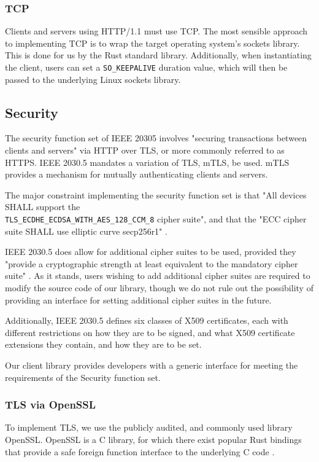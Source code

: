 \subsubsection{TCP}
Clients and servers using HTTP/1.1 must use TCP. The most sensible approach to implementing TCP is to wrap the target operating system's sockets library. This is done for us by the Rust standard library. Additionally, when instantiating the client, users can set a \texttt{SO\_KEEPALIVE} duration value, which will then be passed to the underlying Linux sockets library.

\subsection{Security}
The security function set of IEEE 20305 involves "securing transactions between clients and servers" via HTTP over TLS, or more commonly referred to as HTTPS. IEEE 2030.5 mandates a variation of TLS, mTLS, be used. mTLS provides a mechanism for mutually authenticating clients and servers. 

The major constraint implementing the security function set is that "All devices SHALL support the \\ \texttt{TLS\_ECDHE\_ECDSA\_WITH\_AES\_128\_CCM\_8} cipher suite", and that the "ECC cipher suite SHALL use elliptic curve secp256r1" \cite{IEEE2030.5}.

IEEE 2030.5 does allow for additional cipher suites to be used, provided they "provide a cryptographic strength at least equivalent to the mandatory cipher suite" \cite{IEEE2030.5}.  As it stands, users wishing to add additional cipher suites are required to modify the source code of our library, though we do not rule out the possibility of providing an interface for setting additional cipher suites in the future.

Additionally, IEEE 2030.5 defines six classes of X509 certificates, each with different restrictions on how they are to be signed, and what  X509 certificate extensions they contain, and how they are to be set.

Our client library provides developers with a generic interface for meeting the requirements of the Security function set.

\subsubsection{TLS via OpenSSL}
To implement TLS, we use the publicly audited, and commonly used library OpenSSL. OpenSSL is a C library, for which there exist popular Rust bindings that provide a safe foreign function interface to the underlying C code \cite{openssl}. 

